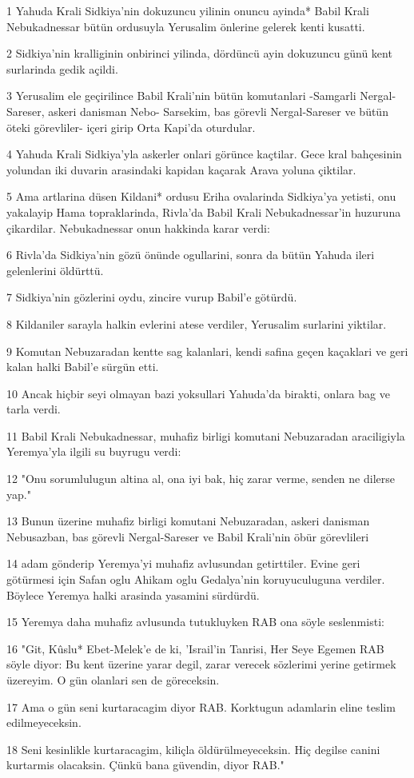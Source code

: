 \par 1 Yahuda Krali Sidkiya'nin dokuzuncu yilinin onuncu ayinda* Babil Krali Nebukadnessar bütün ordusuyla Yerusalim önlerine gelerek kenti kusatti.
\par 2 Sidkiya'nin kralliginin onbirinci yilinda, dördüncü ayin dokuzuncu günü kent surlarinda gedik açildi.
\par 3 Yerusalim ele geçirilince Babil Krali'nin bütün komutanlari -Samgarli Nergal-Sareser, askeri danisman Nebo- Sarsekim, bas görevli Nergal-Sareser ve bütün öteki görevliler- içeri girip Orta Kapi'da oturdular.
\par 4 Yahuda Krali Sidkiya'yla askerler onlari görünce kaçtilar. Gece kral bahçesinin yolundan iki duvarin arasindaki kapidan kaçarak Arava yoluna çiktilar.
\par 5 Ama artlarina düsen Kildani* ordusu Eriha ovalarinda Sidkiya'ya yetisti, onu yakalayip Hama topraklarinda, Rivla'da Babil Krali Nebukadnessar'in huzuruna çikardilar. Nebukadnessar onun hakkinda karar verdi:
\par 6 Rivla'da Sidkiya'nin gözü önünde ogullarini, sonra da bütün Yahuda ileri gelenlerini öldürttü.
\par 7 Sidkiya'nin gözlerini oydu, zincire vurup Babil'e götürdü.
\par 8 Kildaniler sarayla halkin evlerini atese verdiler, Yerusalim surlarini yiktilar.
\par 9 Komutan Nebuzaradan kentte sag kalanlari, kendi safina geçen kaçaklari ve geri kalan halki Babil'e sürgün etti.
\par 10 Ancak hiçbir seyi olmayan bazi yoksullari Yahuda'da birakti, onlara bag ve tarla verdi.
\par 11 Babil Krali Nebukadnessar, muhafiz birligi komutani Nebuzaradan araciligiyla Yeremya'yla ilgili su buyrugu verdi:
\par 12 "Onu sorumlulugun altina al, ona iyi bak, hiç zarar verme, senden ne dilerse yap."
\par 13 Bunun üzerine muhafiz birligi komutani Nebuzaradan, askeri danisman Nebusazban, bas görevli Nergal-Sareser ve Babil Krali'nin öbür görevlileri
\par 14 adam gönderip Yeremya'yi muhafiz avlusundan getirttiler. Evine geri götürmesi için Safan oglu Ahikam oglu Gedalya'nin koruyuculuguna verdiler. Böylece Yeremya halki arasinda yasamini sürdürdü.
\par 15 Yeremya daha muhafiz avlusunda tutukluyken RAB ona söyle seslenmisti:
\par 16 "Git, Kûslu* Ebet-Melek'e de ki, 'Israil'in Tanrisi, Her Seye Egemen RAB söyle diyor: Bu kent üzerine yarar degil, zarar verecek sözlerimi yerine getirmek üzereyim. O gün olanlari sen de göreceksin.
\par 17 Ama o gün seni kurtaracagim diyor RAB. Korktugun adamlarin eline teslim edilmeyeceksin.
\par 18 Seni kesinlikle kurtaracagim, kiliçla öldürülmeyeceksin. Hiç degilse canini kurtarmis olacaksin. Çünkü bana güvendin, diyor RAB."

